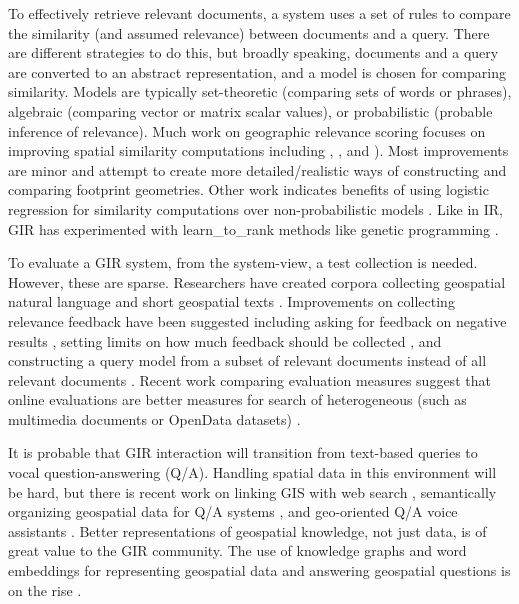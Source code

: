 To effectively retrieve relevant documents, a system uses a set of rules to compare the similarity (and assumed relevance) between documents and a query. There are different strategies to do this, but broadly speaking, documents and a query are converted to an abstract representation, and a model is chosen for comparing similarity. Models are typically set-theoretic (comparing sets of words or phrases), algebraic (comparing vector or matrix scalar values), or probabilistic (probable inference of relevance). Much work on geographic relevance scoring focuses on improving spatial similarity computations including \cite{Larson2004}, \cite{Martins2005}, and \cite{Markowetz2005}). Most improvements are minor and attempt to create more detailed/realistic ways of constructing and comparing footprint geometries. Other work indicates benefits of using logistic regression for similarity computations over non-probabilistic models \cite{Frontiera2008} \cite{Jones2008}. Like in IR, GIR has experimented with \gls{learn_to_rank} methods like genetic programming \cite{Yeh2017}.

To evaluate a GIR system, from the system-view, a test collection is needed. However, these are sparse. Researchers have created corpora collecting geospatial natural language \cite{Stock2013} and short geospatial texts \cite{Wallgrun2017}. Improvements on collecting relevance feedback have been suggested including asking for feedback on negative results \cite{Ma2014}, setting limits on how much feedback should be collected \cite{Losada2019}, and constructing a query model from a subset of relevant documents instead of all relevant documents \cite{Raiber2019}. Recent work comparing evaluation measures suggest that online evaluations are better measures for search of heterogeneous (such as multimedia documents or OpenData datasets) \cite{Zhang2018} \cite{Chen2017}.

It is probable that GIR interaction will transition from text-based queries to vocal question-answering (Q/A). Handling spatial data in this environment will be hard, but there is recent work on linking GIS with web search \cite{Tezuka2006}, semantically organizing geospatial data for Q/A systems \cite{Mai2018}, and geo-oriented Q/A voice assistants \cite{Lafia2019}. Better representations of geospatial knowledge, not just data, is of great value to the GIR community. The use of knowledge graphs and word embeddings for representing geospatial data and answering geospatial questions is on the rise \cite{Mai2019} \cite{Dassereto2019}.
